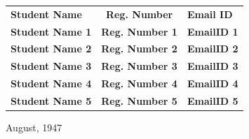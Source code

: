 \begin{center}

    \vspace{5mm}


    \projectFulfillment




    
\begin{table}[H]
\centering
\renewcommand{\arraystretch}{1.3}
    \begin{tabular}{lcl}
    \textbf{Student Name} & \textbf{Reg. Number} & \textbf{Email ID}  \\ %

    \textbf{Student Name 1} & \textbf{Reg. Number 1} & \textbf{EmailID 1} \\ 
    
    \textbf{Student Name 2} & \textbf{Reg. Number 2} & \textbf{EmailID 2} \\
    
    \textbf{Student Name 3} & \textbf{Reg. Number 3} & \textbf{EmailID 3} \\ 
    
    \textbf{Student Name 4} & \textbf{Reg. Number 4} & \textbf{EmailID 4} \\
    
    \textbf{Student Name 5} & \textbf{Reg. Number 5} & \textbf{EmailID 5} \\           
    \end{tabular}
\end{table}




    \vspace{-0.3cm}




    \vspace{-0.4cm}
    

    \universityDetailsTitlePage
    \vspace{-0.6cm}

    
    \begin{center}
    \vspace{0.2cm}
        {\Large August, 1947 \par}
    \end{center}

    
\end{center}